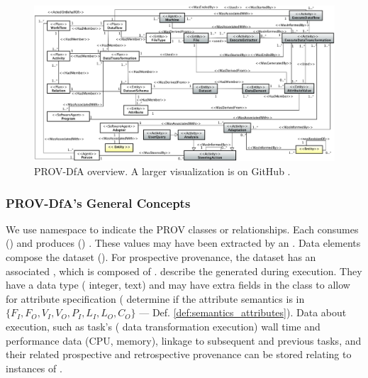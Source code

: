 \begin{figure}[H]
    \centering
    \includegraphics[width=\textwidth]{img/PROV-DfA.png}
    \caption{PROV-DfA overview. A larger visualization is on GitHub \cite{PROV-DfA_GitHub}.}
    \label{fig:prov_dfa_dataschema}
\end{figure}




\subsubsection{PROV-DfA's General Concepts}
\label{sec:prov_dfa_general_concepts}


We use  namespace to indicate the PROV classes or relationships.
Each  consumes () and produces
() .
These values may have been extracted by an  \cite{Silva2017Raw}.
Data elements compose the dataset ().
For prospective provenance, the dataset has an associated ,
which is composed of .
describe the
 generated during execution.
They have a data type (\eg{} integer, text) and may have extra fields in the
 class to allow for attribute specification (\eg{} determine if the
attribute semantics is in
$\{F_{I}, F_O, V_I, V_O, P_I, L_I, L_O, C_O\}$ --- Def. \ref{def:semantics_attributes}).
Data about execution, such as task's (\ie{} data transformation execution)
wall time and performance data (CPU, memory), linkage to subsequent and previous
tasks, and their related prospective and retrospective provenance can be stored
relating to instances of .

